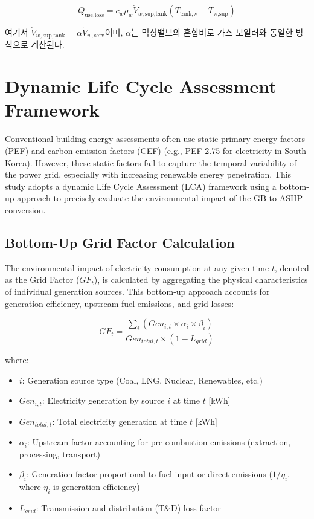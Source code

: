 \documentclass[final,5p,times,twocolumn,authoryear]{elsarticle}
\begin{document}
\begin{equation}
\label{eq:hpb_q_use_loss}
Q_{\text{use,loss}} = c_w \rho_w \dot{V}_{w,\text{sup,tank}} (T_{\text{tank,w}} - T_{\text{w,sup}})
\end{equation}

여기서 $\dot{V}_{w,\text{sup,tank}} = \alpha \dot{V}_{w,\text{serv}}$이며, $\alpha$는 믹싱밸브의 혼합비로 가스 보일러와 동일한 방식으로 계산된다.





\section{Dynamic Life Cycle Assessment Framework}
\label{sec:dynamic_lca}

Conventional building energy assessments often use static primary energy factors (PEF) and carbon emission factors (CEF) (e.g., PEF 2.75 for electricity in South Korea). However, these static factors fail to capture the temporal variability of the power grid, especially with increasing renewable energy penetration. This study adopts a dynamic Life Cycle Assessment (LCA) framework using a bottom-up approach to precisely evaluate the environmental impact of the GB-to-ASHP conversion.

\subsection{Bottom-Up Grid Factor Calculation}
The environmental impact of electricity consumption at any given time $t$, denoted as the Grid Factor ($GF_t$), is calculated by aggregating the physical characteristics of individual generation sources. This bottom-up approach accounts for generation efficiency, upstream fuel emissions, and grid losses:

\begin{equation}
\label{eq:grid_factor}
GF_{t} = \frac{\sum_{i} (Gen_{i,t} \times \alpha_{i} \times \beta_{i})}{Gen_{total,t} \times (1 - L_{grid})}
\end{equation}

where:
\begin{itemize}
    \item $i$: Generation source type (Coal, LNG, Nuclear, Renewables, etc.)
    \item $Gen_{i,t}$: Electricity generation by source $i$ at time $t$ [kWh]
    \item $Gen_{total,t}$: Total electricity generation at time $t$ [kWh]
    \item $\alpha_{i}$: Upstream factor accounting for pre-combustion emissions (extraction, processing, transport)
    \item $\beta_{i}$: Generation factor proportional to fuel input or direct emissions ($1/\eta_i$, where $\eta_i$ is generation efficiency)
    \item $L_{grid}$: Transmission and distribution (T\&D) loss factor
\end{itemize}
\end{document}

